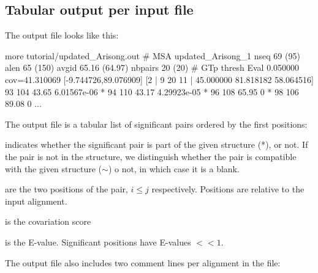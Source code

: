 
\subsection{Tabular output per input file}

The output file  looks like this:

\begin{sreoutput}
more tutorial/updated_Arisong.out 
# MSA updated_Arisong_1 nseq 69 (95) alen 65 (150) avgid 65.16 (64.97) nbpairs 20 (20)
# GTp thresh Eval 0.050000 cov=41.310069 [-9.744726,89.076909] [2 | 9 20 11 | 45.000000 81.818182 58.064516] 
                93             104      43.65   6.01567e-06
*               94             110      43.17   4.29923e-05
*               96             108      65.95   0
*               98             106      89.08   0
...
\end{sreoutput}
The output file is a tabular list of significant pairs ordered by the first positions:

\begin{sreitems}{}
\item[\prog{First column}] indicates whether the significant pair is
  part of the given structure (*), or not.  If the pair is not in the
  structure, we distinguish whether the pair is compatible with the
  given structure ($\sim$) o not, in which case it is a blank.

\item[\prog{Second and third columns}] are the two positions of the
  pair, $i\leq j$ respectively. Positions are relative to the input
  alignment.

\item[\prog{Forth column}] is the covariation score

\item[\prog{Fifth column}] is the E-value. Significant positions
  have E-values $<< 1$.
\end{sreitems}
The output file also includes two comment lines per alignment in the
file:

